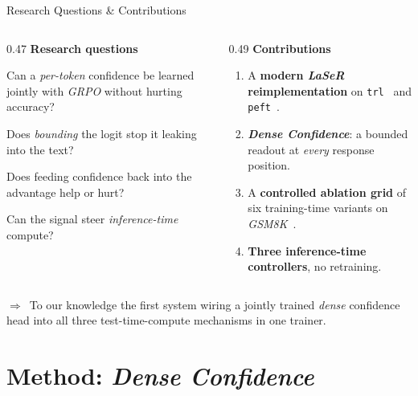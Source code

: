 \documentclass[aspectratio=169,10pt,t]{beamer}
\DeclareRobustCommand{\acit}[1]{\textit{\acs{#1}}}
\newcommand{\takeaway}[1]{%
	\vfill
	\setlength{\fboxsep}{4pt}%
	\noindent\colorbox{jkulight}{%
		\begin{minipage}{\dimexpr\textwidth-2\fboxsep\relax}%
			\footnotesize\raggedright\color{jkunavy}%
			\textcolor{jkumagenta}{\textbf{$\Rightarrow$}}~#1%
		\end{minipage}}%
	\vspace{1pt}%
}
\newcommand{\lead}[1]{{\color{jkunavy}\textbf{#1}}\par\vspace{1pt}}
\newcommand{\nv}[1]{\textcolor{jkunavy}{\textbf{#1}}}
\begin{document}
\begin{frame}{Research Questions \& Contributions}
	\begin{columns}[T, onlytextwidth]
		\begin{column}{0.47\textwidth}
			\lead{Research questions}
			\begin{description}[RQ4]
				\setlength{\itemsep}{5pt}
				\item[\textcolor{jkumagenta}{RQ1}] Can a \emph{per-token} confidence be learned jointly with \acit{GRPO} without hurting accuracy?
				\item[\textcolor{jkumagenta}{RQ2}] Does \emph{bounding} the logit stop it leaking into the text?
				\item[\textcolor{jkumagenta}{RQ3}] Does feeding confidence back into the advantage help or hurt?
				\item[\textcolor{jkumagenta}{RQ4}] Can the signal steer \emph{inference-time} compute?
			\end{description}
		\end{column}
		\begin{column}{0.49\textwidth}
			\lead{Contributions}
			\begin{enumerate}
				\setlength{\itemsep}{5pt}
				\item A \nv{modern \acit{LaSeR} reimplementation} on \texttt{trl}~\citep{trl} and \texttt{peft}~\citep{peft}.
				\item \nv{\textit{Dense Confidence}}: a bounded readout at \emph{every} response position.
				\item A \nv{controlled ablation grid} of six training-time variants on \acit{GSM8K}~\citep{gsm8k}.
				\item \nv{Three inference-time controllers}, no retraining.
			\end{enumerate}
		\end{column}
	\end{columns}
	\takeaway{To our knowledge the first system wiring a jointly trained \emph{dense} confidence head into all three test-time-compute mechanisms in one trainer.}
\end{frame}

\section{Method: \textit{Dense Confidence}}
\end{document}
